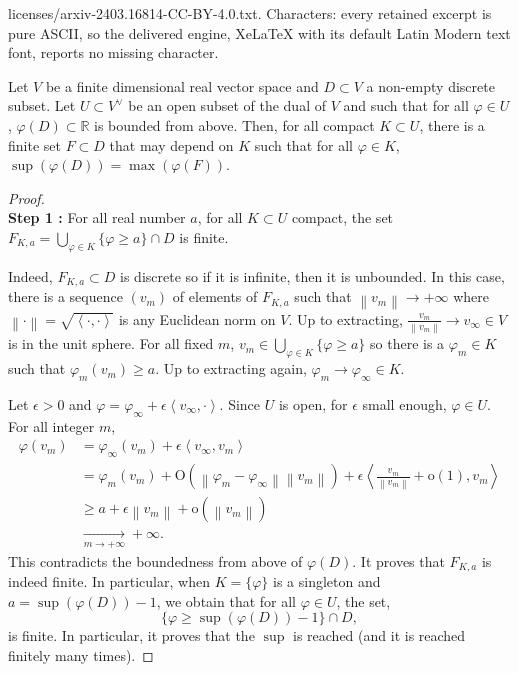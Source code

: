 \documentclass[10pt,a4paper]{amsart}
\newcommand{\R}{\mathbb{R}}
\newcommand{\norme}[1]{\left\| #1 \right\|}
\newcommand{\scal}[2]{\left< #1,#2 \right>}
\newcommand{\tend}[2]{\underset{#1 \rightarrow #2}{\longrightarrow}}
\renewcommand{\geq}{\geqslant}
\begin{document}
licenses/arxiv-2403.16814-CC-BY-4.0.txt. Characters: every retained excerpt is pure ASCII, so the delivered engine, XeLaTeX with its default Latin Modern text font, reports no missing character.
\begin{lemma}\label{LEM:Finitude locale}
    Let $V$ be a finite dimensional real vector space and $D \subset V$ a non-empty discrete subset. Let $U \subset V^\lor$ be an open subset of the dual of $V$ and such that for all $\varphi \in U$, $\varphi(D) \subset \R$ is bounded from above. Then, for all compact $K \subset U$, there is a finite set $F \subset D$ that may depend on $K$ such that for all $\varphi \in K$, $\sup(\varphi(D)) = \max(\varphi(F))$.
\end{lemma}

\begin{proof}\ \\
\vspace{1mm}
\noindent\textbf{Step 1 :} For all real number $a$, for all $K \subset U$ compact, the set $F_{K,a} = \bigcup_{\varphi \in K} \{\varphi \geq a\} \cap D$ is finite.
\vspace{1mm}

Indeed, $F_{K,a} \subset D$ is discrete so if it is infinite, then it is unbounded. In this case, there is a sequence $(v_m)$ of elements of $F_{K,a}$ such that $\norme{v_m} \rightarrow +\infty$ where $\norme{\cdot} = \sqrt{\scal{\cdot}{\cdot}}$ is any Euclidean norm on $V$. Up to extracting, $\frac{v_m}{\norme{v_m}} \rightarrow v_\infty \in V$ is in the unit sphere. For all fixed $m$, $v_m \in \bigcup_{\varphi \in K} \{\varphi \geq a\}$ so there is a $\varphi_m \in K$ such that $\varphi_m(v_m) \geq a$. Up to extracting again, $\varphi_m \rightarrow \varphi_\infty \in K$.

Let $\epsilon > 0$ and $\varphi = \varphi_\infty + \epsilon\scal{v_\infty}{\cdot}$. Since $U$ is open, for $\epsilon$ small enough, $\varphi \in U$. For all integer $m$,
\begin{align*}
    \varphi(v_m) & = \varphi_\infty(v_m) + \epsilon\scal{v_\infty}{v_m}\\
    & = \varphi_m(v_m) + \mathrm{O}(\norme{\varphi_m - \varphi_\infty}\norme{v_m}) + \epsilon\scal{\frac{v_m}{\norme{v_m}} + \mathrm{o}(1)}{v_m}\\
    & \geq a + \epsilon\norme{v_m} + \mathrm{o}(\norme{v_m})\\
    & \tend{m}{+\infty} +\infty.
\end{align*}
This contradicts the boundedness from above of $\varphi(D)$. It proves that $F_{K,a}$ is indeed finite. In particular, when $K = \{\varphi\}$ is a singleton and $a = \sup(\varphi(D)) - 1$, we obtain that for all $\varphi \in U$, the set,
$$
\{\varphi \geq \sup(\varphi(D)) - 1\} \cap D,
$$
is finite. In particular, it proves that the $\sup$ is reached (and it is reached finitely many times).


\end{proof}
\end{document}
